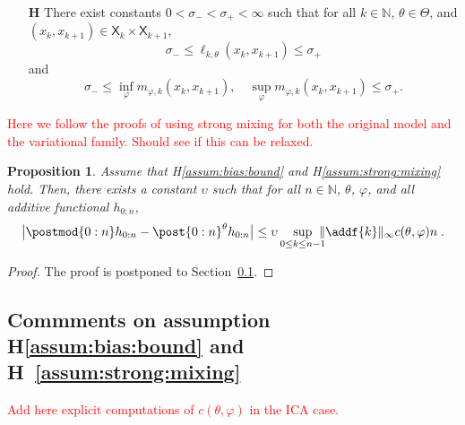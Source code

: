 \documentclass{article}
\newtheorem{proposition}[theorem]{Proposition}
\newcommand{\uksymbol}{\ell}
\newcommand{\udlow}{\sigma_-}
\newcommand{\udup}{\sigma_+}
\newcommand{\ud}[1]{\uksymbol_{#1}}
\newcommand{\nset}{\mathbb{N}}
\newcommand{\1}{\mathbbm{1}}
\newcommand{\Xset}{\mathsf{X}}
\newcommand{\parvec}{\theta}
\newcommand{\eqdef}{\ensuremath{:=}}
\newcommand{\eqsp}{\;}
\newcounter{hypH}
\newenvironment{hypH}{\refstepcounter{hypH}\begin{itemize}
\item[{\bf H\arabic{hypH}}]}{\end{itemize}}
\begin{document}
\begin{hypH}
\label{assum:strong:mixing}
There exist constants $0 < \udlow < \udup < \infty$ such that for all $k \in \nset$, $\theta\in\Theta$, and $(x_k, x_{k + 1}) \in \Xset_k \times \Xset_{k + 1}$, 
$$
    \udlow \leq \ud{k,\theta}(x_k, x_{k + 1}) \leq \udup
$$ 
and 
$$
    \udlow \leq \inf_{\varphi} m_{\varphi,k}(x_k, x_{k + 1}), \quad \sup_{\varphi} m_{\varphi,k}(x_k, x_{k + 1}) \leq \udup. 
$$ 
\end{hypH}
\textcolor{red}{Here we follow the proofs of \cite{gloaguen2019pseudo} using strong mixing for both the original model and the variational family. Should see if this can be relaxed.}

\begin{proposition}
\label{prop:bias}
Assume that H\ref{assum:bias:bound} and H\ref{assum:strong:mixing} hold. Then, there exists a constant $\upsilon$ such that for all $n \in \nset$, $\parvec$, $\varphi$, and all additive functional $h_{0:n}$,  
$$
        \big| \postmod{0:n} h_{0:n} -  \post{0:n}^{\parvec} h_{0:n} \big| 
        \leq \upsilon\sup_{0 \leq k \leq n - 1}\!\!\!\! \| \addf{k} \|_\infty  c(\parvec,\varphi) n\eqsp.
$$
\end{proposition}

\begin{proof}
The proof is postponed to Section~\ref{sec:assumptions}.
\end{proof}

\subsection{Commments on assumption H\ref{assum:bias:bound} and H~\ref{assum:strong:mixing}}
\label{sec:assumptions}
\textcolor{red}{Add here explicit computations of $c(\theta,\varphi)$ in the ICA case.}
\end{document}
